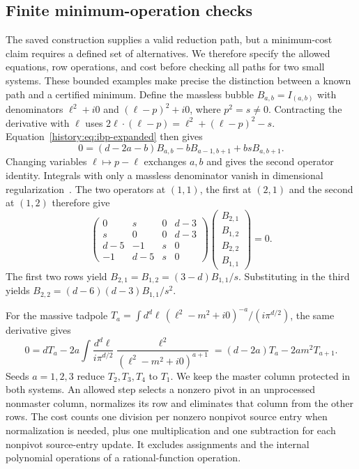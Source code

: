 \subsection{Finite minimum-operation checks}
\label{history:app:optimal}
The saved construction supplies a valid reduction path, but a minimum-cost claim requires a defined set of alternatives. We therefore specify the allowed equations, row operations, and cost before checking all paths for two small systems. These bounded examples make precise the distinction between a known path and a certified minimum. Define the massless bubble $B_{a,b}=I_{(a,b)}$ with denominators $\ell^2+i0$ and $(\ell-p)^2+i0$, where $p^2=s\ne0$. Contracting the derivative with $\ell$ uses $2\ell\cdot(\ell-p)=\ell^2+(\ell-p)^2-s$. Equation~\eqref{history:eq:ibp-expanded} then gives
\begin{equation}
 0=(d-2a-b)B_{a,b}-bB_{a-1,b+1}+bsB_{a,b+1}.
\end{equation}
Changing variables $\ell\mapsto p-\ell$ exchanges $a,b$ and gives the second operator identity. Integrals with only a massless denominator vanish in dimensional regularization~\cite{Weinzierl2022}. The two operators at $(1,1)$, the first at $(2,1)$ and the second at $(1,2)$ therefore give
\begin{equation}
 \begin{pmatrix}0&s&0&d-3\\s&0&0&d-3\\d-5&-1&s&0\\-1&d-5&s&0\end{pmatrix}
 \begin{pmatrix}B_{2,1}\\B_{1,2}\\B_{2,2}\\B_{1,1}\end{pmatrix}=0.
\end{equation}
The first two rows yield $B_{2,1}=B_{1,2}=(3-d)B_{1,1}/s$. Substituting in the third yields $B_{2,2}=(d-6)(d-3)B_{1,1}/s^2$.

For the massive tadpole $T_a=\int d^d\ell\,(\ell^2-m^2+i0)^{-a}/(i\pi^{d/2})$, the same derivative gives
\begin{equation}
 0=dT_a-2a\int\frac{d^d\ell}{i\pi^{d/2}}
 \frac{\ell^2}{(\ell^2-m^2+i0)^{a+1}}
 =(d-2a)T_a-2am^2T_{a+1}.
\end{equation}
Seeds $a=1,2,3$ reduce $T_2,T_3,T_4$ to $T_1$. We keep the master column protected in both systems. An allowed step selects a nonzero pivot in an unprocessed nonmaster column, normalizes its row and eliminates that column from the other rows. The cost counts one division per nonzero nonpivot source entry when normalization is needed, plus one multiplication and one subtraction for each nonpivot source-entry update. It excludes assignments and the internal polynomial operations of a rational-function operation.

